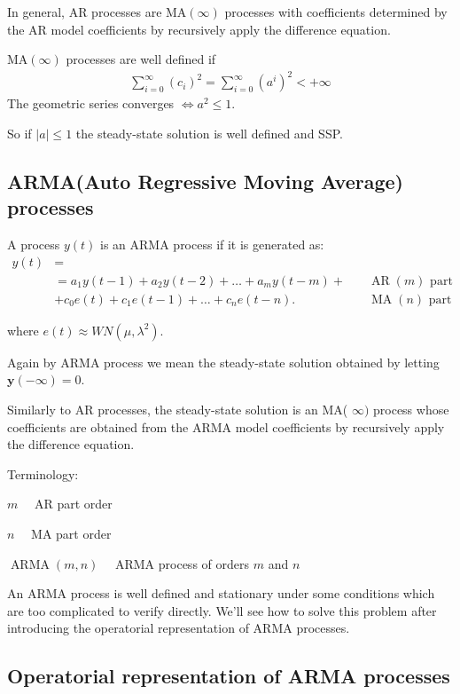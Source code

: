 \documentclass[10pt,a4paper,twoside,openright]{book}
\begin{document}
In general, AR processes are $\mathrm{MA}(\infty)$ processes with coefficients determined by the AR model coefficients by recursively apply the difference equation.

$\mathrm{MA}(\infty)$ processes are well defined if 
\begin{align*}
	\sum_{i=0}^{\infty} \left(c_{i}\right)^2=\sum_{i=0}^{\infty} \left(a^{i}\right)^2< +\infty
\end{align*}
The geometric series converges $\iff a^2\leq 1$.

So if $|a|\leq1$ the steady-state solution is well defined and SSP.

\subsection{ARMA(Auto Regressive Moving Average) processes}

A process $y(t)$ is an ARMA process if it is generated as:
\begin{align*}
	y(t)&=\\
	&=a_{1} y(t-1)+a_{2} y(t-2)+\ldots+a_{m} y(t-m)+\quad &\operatorname{AR}(m) \text{ part}\\ &+c_{0} e(t)+c_{1} e(t-1)+\ldots+c_{n} e(t-n) . \quad &\operatorname{MA}(n) \text{ part}
\end{align*}

where $e(t) \approx W N\left(\mu, \lambda^{2}\right)$.

Again by ARMA process we mean the steady-state solution obtained by letting $\mathbf{y}(-\infty)=0$.
 
 Similarly to AR processes, the steady-state solution is an MA( $\infty)$ process whose coefficients are obtained from the ARMA model coefficients by recursively apply the difference equation.
 
Terminology:

$m \quad$ AR part order

$n \quad$ MA part order

$\operatorname{ARMA}(m, n) \quad$ ARMA process of orders $m$ and $n$

An ARMA process is well defined and stationary under some conditions which are too complicated to verify directly.
We'll see how to solve this problem after introducing the operatorial 
representation of ARMA processes.

\subsection{Operatorial 
	representation of ARMA processes}
\end{document}
